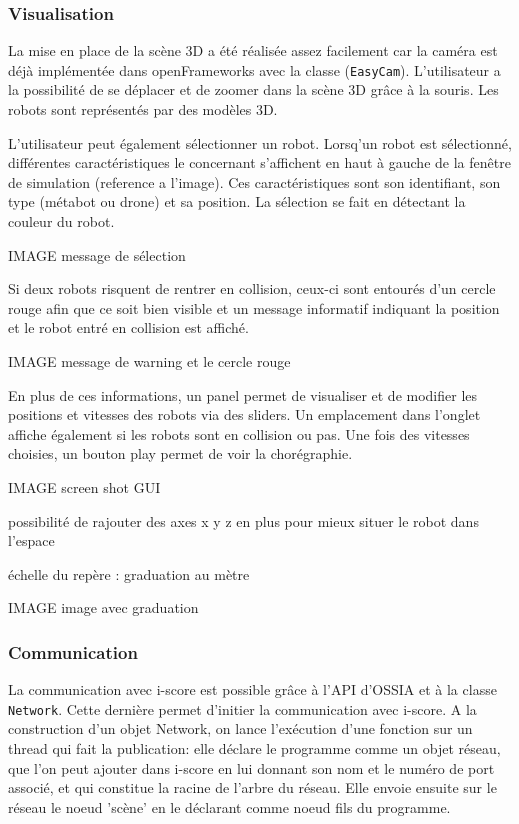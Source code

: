 \subsubsection{Visualisation}

La mise en place de la scène 3D a été réalisée assez facilement car la caméra est déjà implémentée dans openFrameworks avec la classe (\verb|EasyCam|). L'utilisateur a la possibilité de se déplacer et de zoomer dans la scène 3D grâce à la souris. Les robots sont représentés par des modèles 3D.


L'utilisateur peut également sélectionner un robot. Lorsq'un robot est sélectionné, différentes caractéristiques le concernant s'affichent en haut à gauche de la fenêtre de simulation (reference a l'image). Ces caractéristiques sont son identifiant, son type (métabot ou drone) et sa position. La sélection se fait en détectant la couleur du robot.

IMAGE message de sélection


Si deux robots risquent de rentrer en collision, ceux-ci sont entourés d'un cercle rouge afin que ce soit bien visible et un message informatif indiquant la position et le robot entré en collision est affiché.

IMAGE message de warning et le cercle rouge

En plus de ces informations, un panel permet de visualiser et de modifier les positions et vitesses des robots via des sliders. Un emplacement dans l'onglet affiche également si les robots sont en collision ou pas. Une fois des vitesses choisies, un bouton play permet de voir la chorégraphie.

IMAGE screen shot GUI 

possibilité de rajouter des axes x y z en plus pour mieux situer le robot dans l'espace

échelle du repère : graduation au mètre
					
IMAGE image avec graduation

\subsubsection{Communication}

La communication avec i-score est possible grâce à l'API d'OSSIA et à la classe \verb|Network|. Cette dernière permet d'initier la communication avec i-score. A la construction d'un objet Network, on lance l'exécution d'une fonction sur un thread qui fait la publication: elle déclare le programme comme un objet réseau, que l'on peut ajouter dans i-score en lui donnant son nom et le numéro de port associé, et qui constitue la racine de l'arbre du réseau. Elle envoie ensuite sur le réseau le noeud 'scène' en le déclarant comme noeud fils du programme.

